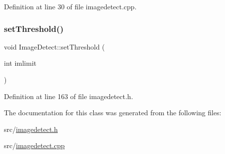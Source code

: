 Definition at line 30 of file imagedetect.\+cpp.

\mbox{\label{class_image_detect_aea9ed08fad1db74ba5ac0925a9ce4642}} 
\subsubsection{\texorpdfstring{setThreshold()}{setThreshold()}}
{\footnotesize\ttfamily void Image\+Detect\+::set\+Threshold (\begin{DoxyParamCaption}\item[{int}]{imlimit }\end{DoxyParamCaption})\hspace{0.3cm}{\ttfamily [inline]}}



Definition at line 163 of file imagedetect.\+h.



The documentation for this class was generated from the following files\+:\begin{DoxyCompactItemize}
\item 
src/\mbox{\hyperlink{imagedetect_8h}{imagedetect.\+h}}\item 
src/\mbox{\hyperlink{imagedetect_8cpp}{imagedetect.\+cpp}}\end{DoxyCompactItemize}
